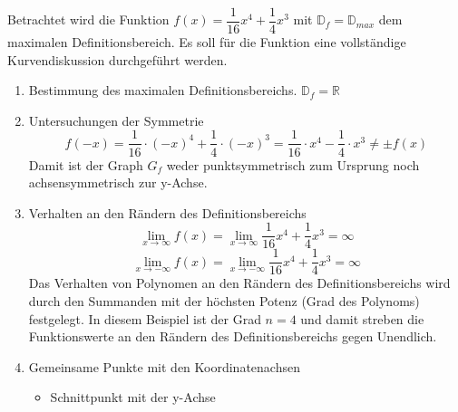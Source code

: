 \begin{bsp}{}{}
Betrachtet wird die Funktion $f(x)= \dfrac{1}{16} x^4 +\dfrac{1}{4} x^3$ mit $\mathds{D}_f =\mathds{D}_{max}$ dem maximalen Definitionsbereich. Es soll für die Funktion eine vollständige Kurvendiskussion durchgeführt werden.
\begin{enumerate}
    \item Bestimmung des maximalen Definitionsbereichs. $\mathds{D}_f = \mathds{R}$
    \item Untersuchungen der Symmetrie
    $$f(-x) = \frac{1}{16} \cdot (-x)^4 + \frac{1}{4} \cdot (-x)^3 = \frac{1}{16} \cdot x^4 - \frac{1}{4} \cdot x^3 \neq \pm f(x)$$ Damit ist der Graph $G_f$ weder punktsymmetrisch zum Ursprung noch achsensymmetrisch zur y-Achse.
    \item Verhalten an den Rändern des Definitionsbereichs
    $$\lim_{x\rightarrow \infty} f(x) = \lim_{x\rightarrow \infty} \dfrac{1}{16}x^4 +\dfrac{1}{4}x^3 = \infty$$
        $$\lim_{x\rightarrow -\infty} f(x) = \lim_{x\rightarrow -\infty} \dfrac{1}{16}x^4 +\dfrac{1}{4}x^3 = \infty$$
        Das Verhalten von Polynomen an den Rändern des Definitionsbereichs wird durch den Summanden mit der höchsten Potenz (Grad des Polynoms) festgelegt. In diesem Beispiel ist der Grad $n=4$ und damit streben die Funktionswerte an den Rändern des Definitionsbereichs gegen Unendlich.
    \item Gemeinsame Punkte mit den Koordinatenachsen
    \begin{itemize}
        \item Schnittpunkt mit der y-Achse
    

\end{itemize}
\end{enumerate}
\end{bsp}
